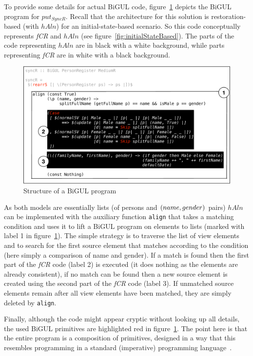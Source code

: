 To provide some details for actual BiGUL code, figure~\ref{fig:bigulSolnDetails} depicts the BiGUL program for $put_{SyncR}$.
Recall that the architecture for this solution is restoration-based (with $\mathit{hAln}$) for an initial-state-based scenario.
So this code conceptually represents \emph{fCR} and $\mathit{hAln}$ (see figure~\ref{fig:initialStateBased}).
The parts of the code representing $\mathit{hAln}$ are in black with a white background, while parts representing \emph{fCR} are in white with a black background.

\begin{figure}[tbp]
    \centering
    \includegraphics[width=\columnwidth]{diagrams/solutions/bigulSolnDetails}
    \caption{Structure of a BiGUL program}
    \label{fig:bigulSolnDetails}
\end{figure}

As both models are essentially lists (of persons and $(name,\- gender)$ pairs) $\mathit{hAln}$ can be implemented with the auxiliary function \texttt{align} that takes a matching condition and uses it to lift a BiGUL program on elements to lists (marked with label 1 in figure~\ref{fig:bigulSolnDetails}).
The simple strategy is to traverse the list of view elements and to search for the first source element that matches according to the condition (here simply a comparison of name and gender).
If a match is found then the first part of the \emph{fCR} code (label 2) is executed (it does nothing as the elements are already consistent), if no match can be found then a new source element is created using the second part of the \emph{fCR} code (label 3).
If unmatched source elements remain after all view elements have been matched, they are simply deleted by \texttt{align}.

Finally, although the code might appear cryptic without looking up all details, the used BiGUL primitives are highlighted red in figure~\ref{fig:bigulSolnDetails}.
The point here is that the entire program is a composition of primitives, designed in a way that this resembles programming in a standard (imperative) programming language~\cite{POPL2018-Ko}.
